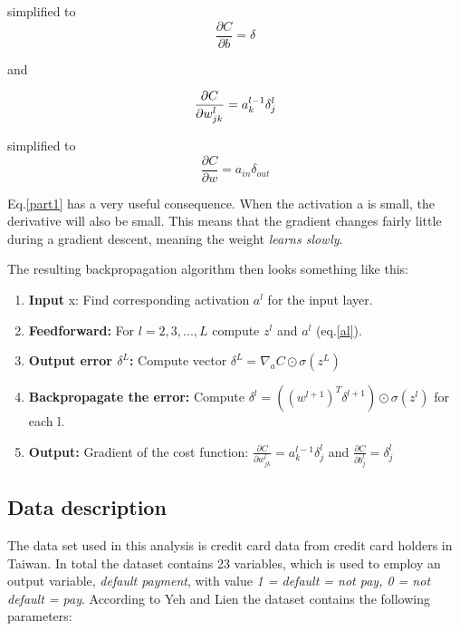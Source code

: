 \documentclass[a4paper,11pt,twocolumn]{article}
\begin{document}
simplified to 
\begin{equation}
\frac{\partial C}{\partial b} = \delta
\end{equation}

and

\begin{equation}
\frac{\partial C}{\partial w_{jk}^l} = a_k^{l-1}\delta_j^l \\
\label{part1}
\end{equation}

simplified to 
\begin{equation}
\frac{\partial C}{\partial w} = a_{in}\delta_{out}
\end{equation}

Eq.\eqref{part1} has a very useful consequence. When the activation a is small, the derivative will also be small. This means that the gradient changes fairly little during a gradient descent, meaning the weight \textit{learns slowly}. 

The resulting backpropagation algorithm then looks something like this:
\begin{enumerate}
\item \textbf{Input} x: Find corresponding activation $a^l$ for the input layer.
\item \textbf{Feedforward:} For $l = 2,3,...,L$ compute $z^l$ and $a^l$ (eq.\eqref{al}).
\item \textbf{Output error $\delta^L$:} Compute vector $\delta^L = \nabla_aC \odot\sigma(z^L)$ 
\item \textbf{Backpropagate the error:} Compute $\delta^l = ((w^{l+1})^T\delta^{l+1})\odot \sigma(z^l)$ for each l.
\item \textbf{Output:} Gradient of the cost function: $\frac{\partial C}{\partial w_{jk}^l} = a_k^{l-1}\delta_j^l$ and    $\frac{\partial C}{\partial b_j^l} = \delta_j^l$
\end{enumerate}

\cite{Nielsen}

\subsection{Data description}

The data set used in this analysis is credit card data from credit card holders in Taiwan. In total the dataset contains 23 variables, which is used to employ an output variable, \textit{default payment}, with value \textit{1 = default = not pay, 0 = not default = pay}. According to Yeh and Lien \cite{data} the dataset contains the following parameters:
   
\end{document}
